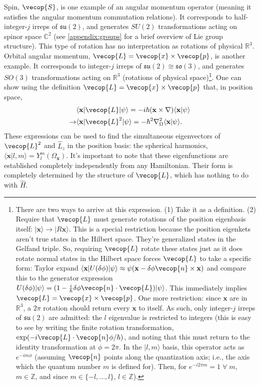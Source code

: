 Spin, $\vecop{S}$, is one example of an angular momentum operator (meaning it satisfies the angular momentum commutation relations). It corresponds to half-integer-$j$ irreps of $\mathfrak{su}(2)$, and generates $SU(2)$ transformations acting on spinor space $\mathbb{C}^2$ (see \cref{appendix:groups} for a brief overview of Lie group structure). This type of rotation has no interpretation as rotations of physical $\mathbb{R}^3$. Orbital angular momentum, $\vecop{L}=\vecop{x}\times\vecop{p}$, is another example. It corresponds to integer-$j$ irreps of $\mathfrak{su}(2)\cong\mathfrak{so}(3)$, and generates $SO(3)$ transformations acting on $\mathbb{R}^3$ (rotations of physical space)\footnote{
There are two ways to arrive at this expression. (1) Take it as a definition. (2) Require that $\vecop{L}$ must generate rotations of the position eigenbasis itself: $|\mathbf{x}\rangle\rightarrow|R\mathbf{x}\rangle$. This is a special restriction because the position eigenkets aren't true states in the Hilbert space. They're generalized states in the Gelfand triple. So, requiring $\vecop{L}$ rotate these states just as it does rotate normal states in the Hilbert space forces $\vecop{L}$ to take a specific form: Taylor expand $\langle \mathbf{x}|U(\delta\phi)|\psi\rangle\approx\psi(\mathbf{x}-\delta\phi\vecop{n}\times\mathbf{x})$ and compare this to the generator expression $U(\delta\phi)|\psi\rangle=(1-\frac{i}{\hbar}\delta\phi\vecop{n}\cdot\vecop{L})|\psi\rangle$. This immediately implies $\vecop{L}=\vecop{x}\times\vecop{p}$. One more restriction: since $\mathbf{x}$ are in $\mathbb{R}^3$, a $2\pi$ rotation should return every $\mathbf{x}$ to itself. As such, only integer-$j$ irreps of $\mathfrak{su}(2)$ are admitted: the $l$ eigenvalue is restricted to integers (this is easy to see by writing the finite rotation transformation, $\exp(-i\vecop{L}\cdot\vecop{n}\phi/\hbar)$, and noting that this must return to the identity transformation at $\phi=2\pi$. In the $|l,m\rangle$ basis, this operator acts as $e^{-im\phi}$ (assuming $\vecop{n}$ points along the quantization axis; i.e., the axis which the quantum number $m$ is defined for). Then, for $e^{-i2\pi m}=1\;\forall\; m$, $m\in\mathbb{Z}$, and since $m\in\{-l, \dots, l\}$, $l\in\mathbb{Z}$). 
}. One can show using the definition $\vecop{L}=\vecop{x}\times\vecop{p}$ that, in position space, 
\begin{align}
    &\langle \mathbf{x}| \vecop{L}|\psi\rangle = -i\hbar(\mathbf{x}\times\nabla)\langle \mathbf{x}|\psi\rangle\nonumber \\
    \rightarrow& \langle \mathbf{x}|\vecop{L}^2|\psi\rangle = -\hbar^2\nabla^2_{\Omega}\langle\mathbf{x}|\psi\rangle\label{eq:angmom-positionrep}.
\end{align}
These expressions can be used to find the simultaneous eigenvectors of $\vecop{L}^2$ and $\hat{L}_z$ in the position basis: the spherical harmonics, $\langle \mathbf{x}|l,m\rangle=Y^m_l(\Omega_{\mathbf{x}})$. It's important to note that these eigenfunctions are established completely independently from any Hamiltonian. Their form is completely determined by the structure of $\vecop{L}$, which has nothing to do with $\hat{H}$.

